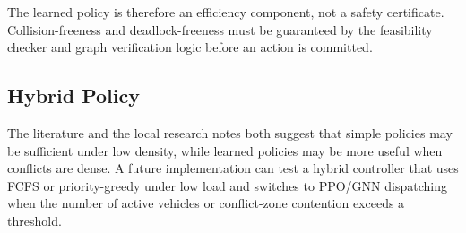 The learned policy is therefore an efficiency component, not a safety certificate. Collision-freeness and deadlock-freeness must be guaranteed by the feasibility checker and graph verification logic before an action is committed.

\subsection{Hybrid Policy}

The literature and the local research notes both suggest that simple policies may be sufficient under low density, while learned policies may be more useful when conflicts are dense. A future implementation can test a hybrid controller that uses FCFS or priority-greedy under low load and switches to PPO/GNN dispatching when the number of active vehicles or conflict-zone contention exceeds a threshold.

